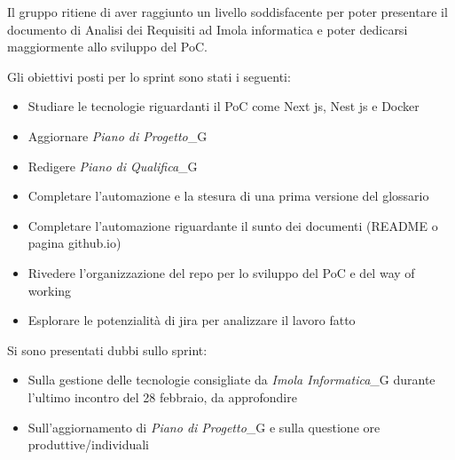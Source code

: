 Il gruppo ritiene di aver raggiunto un livello soddisfacente per poter presentare il documento di Analisi dei Requisiti ad Imola informatica e poter dedicarsi maggiormente allo sviluppo del PoC.

Gli obiettivi posti per lo sprint sono stati i seguenti:
\begin{itemize}
    \item Studiare le tecnologie riguardanti il PoC come Next js, Nest js e Docker
    \item Aggiornare \textit{Piano di Progetto}_G
    \item Redigere \textit{Piano di Qualifica}_G
    \item Completare l'automazione e la stesura di una prima versione del glossario
    \item Completare l'automazione riguardante il sunto dei documenti (README o pagina github.io)
    \item Rivedere l'organizzazione del repo per lo sviluppo del PoC e del way of working
    \item Esplorare le potenzialità di jira per analizzare il lavoro fatto
\end{itemize}

Si sono presentati dubbi sullo sprint:
\begin{itemize}
    \item Sulla gestione delle tecnologie consigliate da \textit{Imola Informatica}_G durante l'ultimo incontro del 28 febbraio, da approfondire
    \item Sull'aggiornamento di \textit{Piano di Progetto}_G e sulla questione ore produttive/individuali
\end{itemize}


